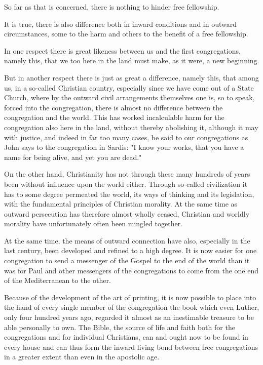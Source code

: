 So far as that is concerned, there is nothing to hinder free fellowship.

It is true, there is also difference both in inward conditions and in outward circumstances, some to the harm and others to the benefit of a free fellowship.

In one respect there is great likeness between us and the first congregations, namely this, that we too here in the land must make, as it were, a new beginning.

But in another respect there is just as great a difference, namely this, that among us, in a so-called Christian country, especially since we have come out of a State Church, where by the outward civil arrangements themselves one is, so to speak, forced into the congregation, there is almost no difference between the congregation and the world. This has worked incalculable harm for the congregation also here in the land, without thereby abolishing it, although it may with justice, and indeed in far too many cases, be said to our congregations as John says to the congregation in Sardis: "I know your works, that you have a name for being alive, and yet you are dead."

On the other hand, Christianity has not through these many hundreds of years been without influence upon the world either. Through so-called civilization it has to some degree permeated the world, its ways of thinking and its legislation, with the fundamental principles of Christian morality. At the same time as outward persecution has therefore almost wholly ceased, Christian and worldly morality have unfortunately often been mingled together.

At the same time, the means of outward connection have also, especially in the last century, been developed and refined to a high degree. It is now easier for one congregation to send a messenger of the Gospel to the end of the world than it was for Paul and other messengers of the congregations to come from the one end of the Mediterranean to the other.

Because of the development of the art of printing, it is now possible to place into the hand of every single member of the congregation the book which even Luther, only four hundred years ago, regarded it almost as an inestimable treasure to be able personally to own. The Bible, the source of life and faith both for the congregations and for individual Christians, can and ought now to be found in every house and can thus form the inward living bond between free congregations in a greater extent than even in the apostolic age.


